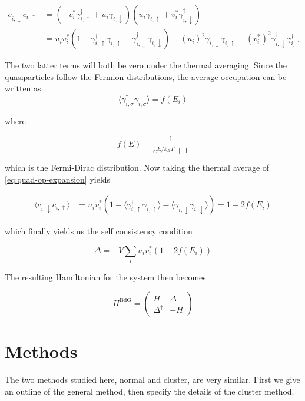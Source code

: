 \documentclass[11pt]{article}
\begin{document}
\begin{align}\label{eq:quad-op-expansion}
	c_{i,\downarrow} c_{i,\uparrow} &= (-v_i^* \gamma_{i,\uparrow}^\dagger + u_i \gamma_{i,\downarrow})(u_i\gamma_{i,\uparrow} + v_i^* \gamma_{i,\downarrow}^\dagger) \nonumber \\
					&= u_i v_i^*(1 - \gamma_{i,\uparrow}^\dagger\gamma_{i,\uparrow} - \gamma_{i,\downarrow}^\dagger\gamma_{i,\downarrow}) + (u_i)^2 \gamma_{i,\downarrow} \gamma_{i,\uparrow} - (v_i^*)^2\gamma_{i,\downarrow}^\dagger \gamma_{i,\uparrow}^\dagger 
\end{align}

The two latter terms will both be zero under the thermal averaging. Since the quasiparticles follow the Fermion distributions, the average occupation can be written as
\begin{equation}
	\langle \gamma_{i,\sigma}^\dagger \gamma_{i,\sigma} \rangle = f(E_i)
\end{equation}

where

\begin{equation}
	f(E) = \frac{1}{e^{E/k_BT} + 1}
\end{equation}

which is the Fermi-Dirac distribution. Now taking the thermal average of \eqref{eq:quad-op-expansion} yields

\begin{align}
	\langle c_{i,\downarrow} c_{i,\uparrow} \rangle &=  u_i v_i^*(1 - \langle \gamma_{i,\uparrow}^\dagger\gamma_{i,\uparrow} \rangle  - \langle \gamma_{i,\downarrow}^\dagger\gamma_{i,\downarrow} \rangle ) = 1 - 2f(E_i)
\end{align}

which finally yields us the self consistency condition

\begin{equation}
	\Delta = -V \sum_i u_i v_i^* (1 - 2f(E_i))
\end{equation}

The resulting Hamiltonian for the system then becomes

\begin{equation} \label{eq:bdg-hamiltonian}
  H^{\text{BdG}} = \begin{pmatrix}
    H & \Delta \\ \Delta^\dagger & -H
  \end{pmatrix}
\end{equation}

\section{Methods}\label{sec:methods}
The two methods studied here, normal and cluster, are very similar. First we give an outline of the general method, then specify the details of the cluster method. 
\end{document}
